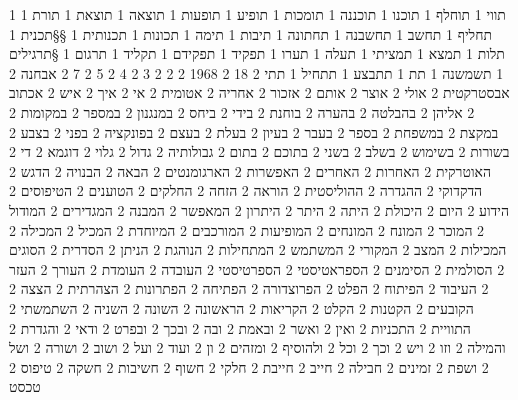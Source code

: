       1 תווי
      1 תוחלף
      1 תוכנו
      1 תוכננה
      1 תומכות
      1 תופיע
      1 תופעות
      1 תוצאה
      1 תוצאת
      1 תורת
      1 תחליף
      1 תחשב
      1 תחשבנה
      1 תחתונה
      1 תיבות
      1 תימה
      1 תכונות
      1 תכנותית
      1 §§תכנית
      1 תלות
      1 תמצא
      1 תמציתי
      1 תעלה
      1 תערו
      1 תפקיד
      1 תפקידם
      1 תקליד
      1 תרגום
      1 §תרגילים
      1 תשמשנה
      1 תת
      1 תתבצע
      1 תתחיל
      1 תתי
      2 18
      2 1968
      2 2
      2 3
      2 4
      2 5
      2 7
      2 אבחנה
      2 אבסטרקטית
      2 אולי
      2 אוצר
      2 אותם
      2 אזכור
      2 אחריה
      2 אטומית
      2 אי
      2 איך
      2 איש
      2 אכתוב
      2 אליהן
      2 בהבלטה
      2 בהערה
      2 בוחנת
      2 בידי
      2 ביחס
      2 במנגנון
      2 במספר
      2 במקומות
      2 במקצת
      2 במשפחת
      2 בספר
      2 בעבר
      2 בעיון
      2 בעלת
      2 בעצם
      2 בפונקציה
      2 בפני
      2 בצבע
      2 בשורות
      2 בשימוש
      2 בשלב
      2 בשני
      2 בתוכם
      2 בתום
      2 גבולותיה
      2 גדול
      2 גלוי
      2 דוגמא
      2 די
      2 האוטרקית
      2 האחרות
      2 האחרים
      2 האפשרות
      2 הארגומנטים
      2 הבאה
      2 הבנויה
      2 הדגש
      2 הדקדוקי
      2 ההגדרה
      2 ההוליסטית
      2 הוראה
      2 הזחה
      2 החלקים
      2 הטוענים
      2 הטיפוסים
      2 הידוע
      2 היום
      2 היכולת
      2 היתה
      2 היתר
      2 היתרון
      2 המאפשר
      2 המבנה
      2 המגדירים
      2 המודול
      2 המוכר
      2 המונח
      2 המונחים
      2 המופיעות
      2 המורכבים
      2 המיוחדת
      2 המכיל
      2 המכילה
      2 המכילות
      2 המצב
      2 המקורי
      2 המשתמש
      2 המתחילות
      2 הנוהגת
      2 הניתן
      2 הסדרית
      2 הסוגים
      2 הסולמית
      2 הסימנים
      2 הספראטיסטי
      2 הספרטיסטי
      2 העובדה
      2 העומדת
      2 העורך
      2 העזר
      2 העיבוד
      2 הפיתוח
      2 הפלט
      2 הפרוצדורה
      2 הפתיחה
      2 הפתרונות
      2 הצהרתית
      2 הצצה
      2 הקובעים
      2 הקטנות
      2 הקלט
      2 הקריאות
      2 הראשונה
      2 השונה
      2 השניה
      2 השתמשתי
      2 התוויית
      2 התכניות
      2 ואין
      2 ואשר
      2 ובאמת
      2 ובה
      2 ובכך
      2 ובפרט
      2 ודאי
      2 והגדרת
      2 והמילה
      2 וזו
      2 ויש
      2 וכך
      2 וכל
      2 ולהוסיף
      2 ומזהים
      2 ון
      2 ועוד
      2 ועל
      2 ושוב
      2 ושורה
      2 ושל
      2 ושפת
      2 זמינים
      2 חבילה
      2 חייב
      2 חייבת
      2 חלקי
      2 חשוף
      2 חשיבות
      2 חשקה
      2 טיפוס
      2 טכסט
